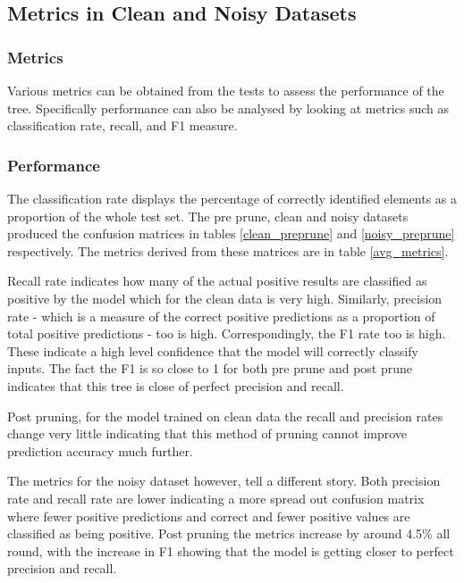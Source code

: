 \documentclass{article}
\begin{document}
\subsection{Metrics in Clean and Noisy Datasets}

\subsubsection{Metrics}

Various metrics can be obtained from the tests to assess the performance of the tree. Specifically performance can also be analysed by looking at metrics such as classification rate, recall, and F1 measure.

\subsubsection{Performance}

The classification rate displays the percentage of correctly identified elements as a proportion of the whole test set. The pre prune, clean and noisy datasets produced the confusion matrices in tables \ref{clean_preprune} and \ref{noisy_preprune} respectively. The metrics derived from these matrices are in table \ref{avg_metrics}.

Recall rate indicates how many of the actual positive results are classified as positive by the model which for the clean data is very high. Similarly, precision rate - which is a measure of the correct positive predictions as a proportion of total positive predictions - too is high. Correspondingly, the F1 rate too is high. These indicate a high level confidence that the model will correctly classify inputs. The fact the F1 is so close to 1 for both pre prune and post prune indicates that this tree is close of perfect precision and recall.

Post pruning, for the model trained on clean data the recall and precision rates change very little indicating that this method of pruning cannot improve prediction accuracy much further.

The metrics for the noisy dataset however, tell a different story. Both precision rate and recall rate are lower indicating a more spread out confusion matrix where fewer positive predictions and correct and fewer positive values are classified as being positive. Post pruning the metrics increase by around 4.5\% all round, with the increase in F1 showing that the model is getting closer to perfect precision and recall.
\end{document}
